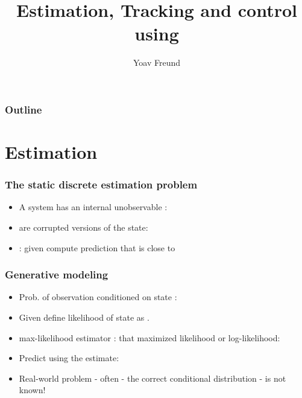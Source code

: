 \documentclass{beamer}
\title[\ouralg] %
{Estimation, Tracking and control using \ouralg}
\author[Freund] %
{Yoav Freund}
\institute[Universities of Somewhere and Elsewhere] %
\begin{document}
\begin{frame}
  \titlepage
\end{frame}

\begin{frame}
  \frametitle{Outline}
  \tableofcontents[pausesections]
\end{frame}

\section{Estimation}

\begin{frame}
\frametitle{The static discrete estimation problem}
\begin{itemize}
\item A system has an internal unobservable :
\item {} are corrupted versions of the state: 
\item {}: given  compute prediction
 that is close to 
\end{itemize}
\end{frame}

\begin{frame}
\frametitle{Generative modeling}
\begin{itemize}
\item Prob. of observation  conditioned on state :\newline
{}
\item Given  define likelihood of state
   as .
\item max-likelihood estimator :  
that maximized likelihood or log-likelihood:\newline
{}
\item Predict using the estimate: 
\item Real-world problem - often  - the
  correct conditional distribution -  is not known!
\end{itemize}
\end{frame}
\end{document}
